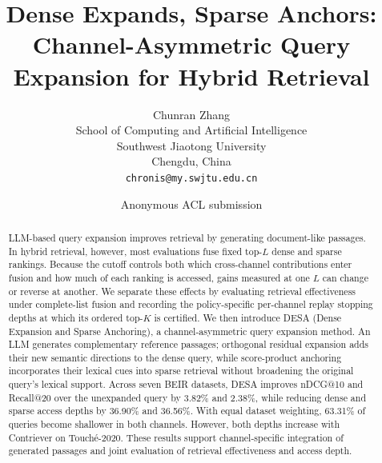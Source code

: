 \documentclass[11pt]{article}
\title{Dense Expands, Sparse Anchors: Channel-Asymmetric Query Expansion for Hybrid Retrieval}
\author{
  Chunran Zhang \\
  School of Computing and Artificial Intelligence \\
  Southwest Jiaotong University \\
  Chengdu, China \\
  \texttt{chronis@my.swjtu.edu.cn}
}
\author{Anonymous ACL submission}
\begin{document}
\maketitle

\begin{abstract}
LLM-based query expansion improves retrieval by generating document-like
passages. In hybrid retrieval, however, most evaluations
fuse fixed top-$L$ dense and sparse rankings. Because the cutoff controls both
which cross-channel contributions enter fusion and how much of each ranking is
accessed, gains measured at one $L$ can change or reverse at another. We
separate these effects by evaluating retrieval effectiveness under
complete-list fusion and recording the policy-specific per-channel replay
stopping depths at which its ordered top-$K$ is certified. We then introduce DESA (Dense
Expansion and Sparse Anchoring), a channel-asymmetric query expansion method.
An LLM generates complementary reference passages;
orthogonal residual expansion adds their new semantic directions to the dense
query, while score-product anchoring incorporates their lexical cues into
sparse retrieval without broadening the original query's lexical support.
Across seven BEIR datasets, DESA improves nDCG@10 and Recall@20
over the unexpanded query by 3.82\% and 2.38\%, while reducing dense and sparse
access depths by 36.90\% and 36.56\%. With equal dataset weighting, 63.31\%
of queries become shallower in both channels. However, both depths increase
with Contriever on Touch\'e-2020. These results support channel-specific
integration of generated passages and joint evaluation of retrieval
effectiveness and access depth.
\end{abstract}











\appendix

\end{document}
